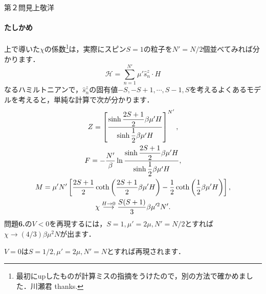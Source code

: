 \begin{answer}{第２問}{見上敬洋}
\begin{enumerate}
  \paragraph{たしかめ} 
  {\small 上で導いた$\chi$の係数\footnote{最初にupしたものが計算ミスの指摘をうけたので，別の方法で確かめました．川瀬君 thanks.}は，実際にスピン$S=1$の粒子を$N' = N/2$個並べてみれば分かります．
  \[
  \mathcal{H} = \sum_{n=1}^{N'} \mu' \hat{s}_n^z\cdot H 
  \]
  なるハミルトニアンで，$\hat{s}_n^z$の固有値$-S,-S+1,\cdots, S-1,S$を考えるよくあるモデルを考えると，単純な計算で次が分かります．
  \begin{gather}
  Z = \left[\frac{\sinh\dfrac{2S+1}{2}\beta\mu' H}{\sinh\dfrac 12 \beta \mu' H }\right]^{N'}, \notag\\
  F = -\frac{N'}{\beta}\ln \frac{\sinh\dfrac{2S+1}{2}\beta\mu' H}{\sinh\dfrac 12 \beta \mu' H }, \notag\\
  M = \mu' N'\left[\frac{2S+1}{2}\coth\left(\frac{2S+1}{2}\beta\mu' H\right) - \frac 12 \coth\left(\frac 12 \beta\mu' H\right)\right], \notag \\
  \chi \stackrel{H\to 0}{\longrightarrow} \frac{S(S+1)}{3}\beta\mu'^2 N' . \notag
  \end{gather}
  問題\textbf{6.}の$V<0$を再現するには，$S=1,\mu' = 2\mu, N' = N/2$とすれば$\chi \to (4/3)\beta\mu^2N$が出ます．

  $V=0$は$S=1/2, \mu' =2\mu, N' = N$とすれば再現されます．
  }

\end{enumerate}
\end{answer}
